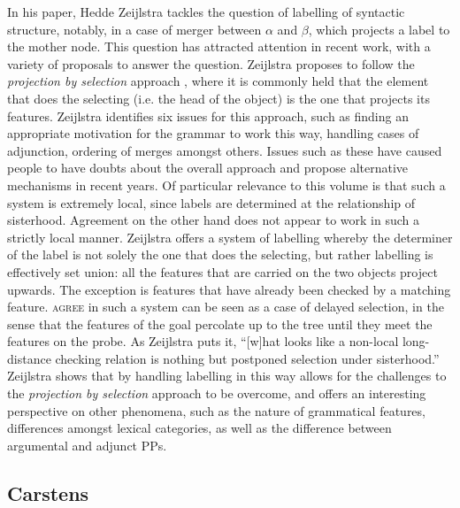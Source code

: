 \documentclass[output=paper
,modfonts
,nonflat]{langsci/langscibook}
\begin{document}
In his paper, Hedde Zeijlstra tackles the question of labelling of syntactic structure, notably, in a case of merger between $\alpha$ and $\beta$, which projects a label to the mother node.
This question has attracted attention in recent work, with a variety of proposals to answer the question.
Zeijlstra proposes to follow the \textit{projection by selection} approach \citep{Adger2003}, where it is commonly held that the element that does the selecting (i.e. the head of the object) is the one that projects its features.
Zeijlstra identifies six issues for this approach, such as finding an appropriate motivation for the grammar to work this way, handling cases of adjunction, ordering of merges amongst others.
Issues such as these have caused people to have doubts about the overall approach and propose alternative mechanisms in recent years.
Of particular relevance to this volume is that such a system is extremely local, since labels are determined at the relationship of sisterhood.
Agreement on the other hand does not appear to work in such a strictly local manner.
Zeijlstra offers a system of labelling whereby the determiner of the label is not solely the one that does the selecting, but rather labelling is effectively set union: all the features that are carried on the two objects project upwards.
The exception is features that have already been checked by a matching feature.
\textsc{agree} in such a system can be seen as a case of delayed selection, in the sense that the features of the goal percolate up to the tree until they meet the features on the probe.
As Zeijlstra puts it, ``[w]hat looks like a non-local long-distance checking relation is nothing but postponed selection under sisterhood.''
Zeijlstra shows that by handling labelling in this way allows for the challenges to the \textit{projection by selection} approach to be overcome, and offers an interesting perspective on other phenomena, such as the nature of grammatical features, differences amongst lexical categories, as well as the difference between argumental and adjunct PPs.

\subsection{Carstens}
\label{sec:carstens}
\end{document}
